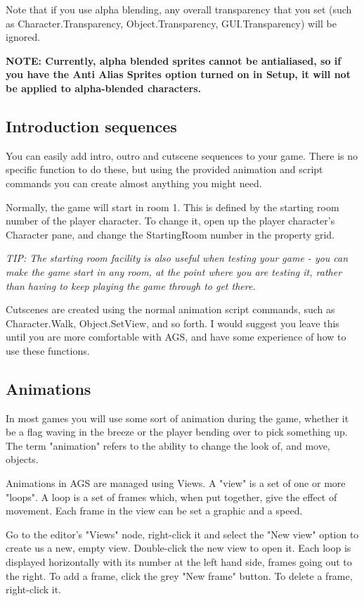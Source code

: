 Note that if you use alpha blending, any overall transparency that you set (such
as Character.Transparency, Object.Transparency, GUI.Transparency) will be ignored.

\bf{NOTE:} Currently, alpha blended sprites cannot be antialiased, so if you have
the Anti Alias Sprites option turned on in Setup, it will not be applied to alpha-blended
characters.

\subsection{Introduction sequences}%

You can easily add intro, outro and cutscene sequences to your game. There
is no specific function to do these, but using the provided animation and
script commands you can create almost anything you might need.

Normally, the game will start in room 1. This is defined by the starting room
number of the player character. To change it, open up the player character's
Character pane, and change the StartingRoom number in the property grid.

\it{TIP: The starting room facility is also useful when testing your game - you
can make the game start in any room, at the point where you are testing it,
rather than having to keep playing the game through to get there.}

Cutscenes are created using the normal animation script commands, such as
Character.Walk, Object.SetView, and so forth. I would suggest you leave this
until you are more comfortable with AGS, and have some experience of how
to use these functions.

\subsection{Animations}\label{Views}%

In most games you will use some sort of animation during the game, whether
it be a flag waving in the breeze or the player bending over to pick something
up. The term "animation" refers to the ability to change the look of, and
move, objects.

Animations in AGS are managed using Views. A "view" is a set of one or more
"loops". A loop is a set of frames which, when put together, give the effect
of movement. Each frame in the view can be set a graphic and a speed.

Go to the editor's "Views" node, right-click it and select the "New view"
option to create us a new, empty view. Double-click the new view to open it.
Each loop is displayed horizontally with its number at the left hand side,
frames going out to the right. To add a frame, click the grey "New frame"
button. To delete a frame, right-click it.

